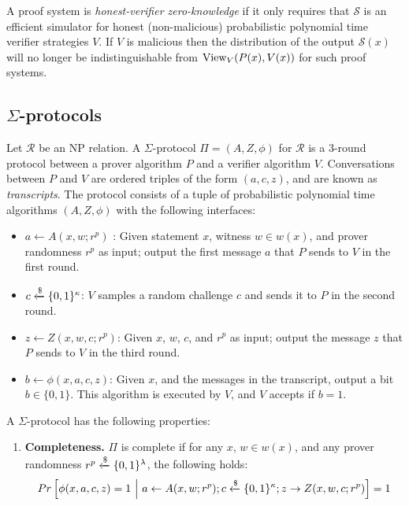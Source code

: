 \begin{definition}
A proof system is \textit{honest-verifier zero-knowledge} if it only requires that $\mathcal S$ is an efficient simulator for honest (non-malicious) probabilistic polynomial time verifier strategies $V$. If $V$ is malicious then the distribution of the output $\mathcal S(x)$ will no longer be indistinguishable from $\text{View}_V(P(x),V(x))$ for such proof systems. 
\end{definition}

\subsection{$\Sigma$-protocols}
\begin{definition}
Let $\mathcal R$ be an NP relation. A $\Sigma$-protocol $\Pi = (A, Z, \phi)$ for $\mathcal R$ is a 3-round protocol between a prover algorithm $P$ and a verifier algorithm $V$. Conversations between $P$ and $V$ are ordered triples of the form $(a,c,z)$, and are known as \textit{transcripts}. The protocol consists of a tuple of probabilistic polynomial time algorithms $(A, Z, \phi)$ with the following interfaces:
\begin{itemize}
    \item $a \leftarrow A(x,w; r^p)$ : Given statement $x$, witness $w \in w(x)$, and prover randomness $r^p$ as input; output the first message $a$ that $P$ sends to $V$ in the first round. 
    \item $c \xleftarrow{\$} \{0,1\}^\kappa$: $V$ samples a random challenge $c$ and sends it to $P$ in the second round. 
    \item $z \leftarrow Z(x,w,c; r^p)$: Given $x$, $w$, $c$, and $r^p$ as input; output the message $z$ that $P$ sends to $V$ in the third round.
    \item $b \leftarrow \phi(x,a,c,z)$: Given $x$, and the messages in the transcript, output a bit $b \in \{0,1\}$. This algorithm is executed by $V$, and $V$ accepts if $b = 1$.
\end{itemize}
A $\Sigma$-protocol has the following properties:
\begin{enumerate}
    \item \textbf{Completeness.} $\Pi$ is complete if for any $x$, $w \in w(x)$, and any prover randomness $r^p \xleftarrow{\$} \{0,1\}^\lambda$, the following holds:
    \begin{gather*}
        Pr\left[\phi(x,a,c,z) = 1 \st a \leftarrow A(x,w;r^p); c\samplefrom \{0,1\}^\kappa; z \rightarrow Z(x,w,c;r^p)\right] = 1

\end{gather*}
\end{enumerate}
\end{definition}
